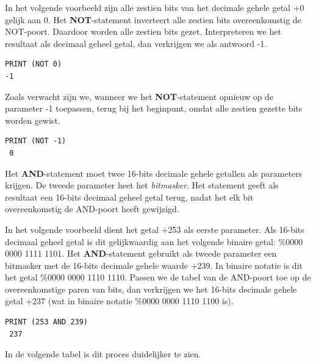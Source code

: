 In het volgende voorbeeld zijn alle zestien bits van het decimale gehele getal +0 gelijk aan 0. Het {\bf NOT}-statement inverteert alle zestien bits overeenkomstig de NOT-poort. Daardoor worden alle zestien bits gezet. Interpreteren we het resultaat als decimaal geheel getal, dan verkrijgen we als antwoord -1.
\begin{tcolorbox}[colback=black,coltext=white]
\verbatimfont{\codefont}
\begin{verbatim}
PRINT (NOT 0)
-1
\end{verbatim}
\end{tcolorbox}

Zoals verwacht zijn we, wanneer we het {\bf NOT}-statement opnieuw op de parameter -1 toepassen, terug bij het beginpunt, omdat alle zestien gezette bits worden gewist.
\begin{tcolorbox}[colback=black,coltext=white]
\verbatimfont{\codefont}
\begin{verbatim}
PRINT (NOT -1)
 0
\end{verbatim}
\end{tcolorbox}

Het {\bf AND}-statement moet twee 16-bits decimale gehele getallen als parameters krijgen. De tweede parameter heet het {\it bitmasker}. Het statement geeft als resultaat een 16-bits decimaal geheel getal terug, nadat het elk bit overeenkomstig de AND-poort heeft gewijzigd.

In het volgende voorbeeld dient het getal +253 als eerste parameter. Als 16-bits decimaal geheel getal is dit gelijkwaardig aan het volgende binaire getal: \%0000 0000 1111 1101. Het {\bf AND}-statement gebruikt als tweede parameter een bitmasker met de 16-bits decimale gehele waarde +239. In binaire notatie is dit het getal \%0000 0000 1110 1110. Passen we de tabel van de AND-poort toe op de overeenkomstige paren van bits, dan verkrijgen we het 16-bits decimale gehele getal +237 (wat in binaire notatie \%0000 0000 1110 1100 is).
\begin{tcolorbox}[colback=black,coltext=white]
\verbatimfont{\codefont}
\begin{verbatim}
PRINT (253 AND 239)
 237
\end{verbatim}
\end{tcolorbox}

In de volgende tabel is dit proces duidelijker te zien.

